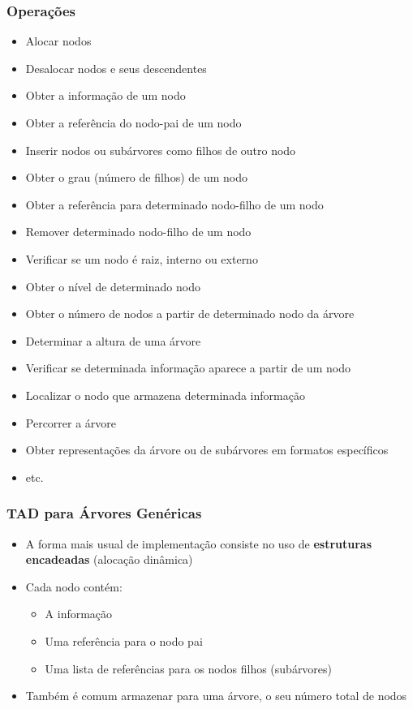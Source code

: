 \documentclass[aspectratio=169]{beamer}
\begin{document}
\begin{frame}\frametitle{Operações}
\begin{itemize}
	\scriptsize
	\item Alocar nodos
	\item Desalocar nodos e seus descendentes
	\item Obter a informação de um nodo
	\item Obter a referência do nodo-pai de um nodo
	\item Inserir nodos ou subárvores como filhos de outro nodo
	\item Obter o grau (número de filhos) de um nodo
	\item Obter a referência para determinado nodo-filho de um nodo
	\item Remover determinado nodo-filho de um nodo
	\item Verificar se um nodo é raiz, interno ou externo
	\item Obter o nível de determinado nodo
	\item Obter o número de nodos a partir de determinado nodo da árvore
	\item Determinar a altura de uma árvore
	\item Verificar se determinada informação aparece a partir de um nodo
	\item Localizar o nodo que armazena determinada informação
	\item Percorrer a árvore
	\item Obter representações da árvore ou de subárvores em formatos específicos
	\item etc.
\end{itemize}
\end{frame}

\begin{frame}\frametitle{TAD para Árvores Genéricas}
\begin{itemize}
	\item A forma mais usual de implementação consiste no uso de \textbf{estruturas encadeadas} (alocação dinâmica)
	\item Cada nodo contém:
	\begin{itemize}
		\item A informação
		\item Uma referência para o nodo pai
		\item Uma lista de referências para os nodos filhos (subárvores)
	\end{itemize}
	\item Também é comum armazenar para uma árvore, o seu número total de nodos
\end{itemize}
\end{frame}
\end{document}
